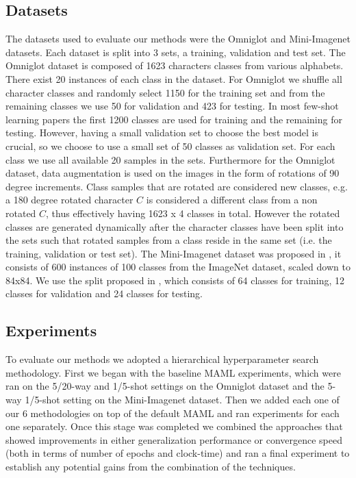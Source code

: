 \documentclass{article} \usepackage[dvipsnames]{xcolor}
\begin{document}
\subsection{Datasets}\label{datasets-maml}
The datasets used to evaluate our methods were the Omniglot \citep{lake2015human} and Mini-Imagenet \citep{vinyals2016matching,ravi2016optimization} datasets. Each dataset is split into 3 sets, a training, validation and test set. The Omniglot dataset is composed of 1623 characters classes from various alphabets. There exist 20 instances of each class in the dataset. For Omniglot we shuffle all character classes and randomly select 1150 for the training set and from the remaining classes we use 50 for validation and 423 for testing. In most few-shot learning papers the first 1200 classes are used for training and the remaining for testing. However, having a small validation set to choose the best model is crucial, so we choose to use a small set of 50 classes as validation set. For each class we use all available 20 samples in the sets. Furthermore for the Omniglot dataset, data augmentation is used on the images in the form of rotations of 90 degree increments. Class samples that are rotated are considered new classes, e.g. a 180 degree rotated character $C$ is considered a different class from a non rotated $C$, thus effectively having 1623 x 4 classes in total. However the rotated classes are generated dynamically after the character classes have been split into the sets such that rotated samples from a class reside in the same set (i.e. the training, validation or test set).
The Mini-Imagenet dataset was proposed in \cite{ravi2016optimization}, it consists of 600 instances of 100 classes from the ImageNet dataset, scaled down to 84x84. We use the split proposed in \cite{ravi2016optimization}, which consists of 64 classes for training, 12 classes for validation and 24 classes for testing.

\subsection{Experiments}
To evaluate our methods we adopted a hierarchical hyperparameter search methodology. First we began with the baseline MAML experiments, which were ran on the 5/20-way and 1/5-shot settings on the Omniglot dataset and the 5-way 1/5-shot setting on the Mini-Imagenet dataset. Then we added each one of our 6 methodologies on top of the default MAML and ran experiments for each one separately. Once this stage was completed we combined the approaches that showed improvements in either generalization performance or convergence speed (both in terms of number of epochs and clock-time) and ran a final experiment to establish any potential gains from the combination of the techniques.  
\end{document}
